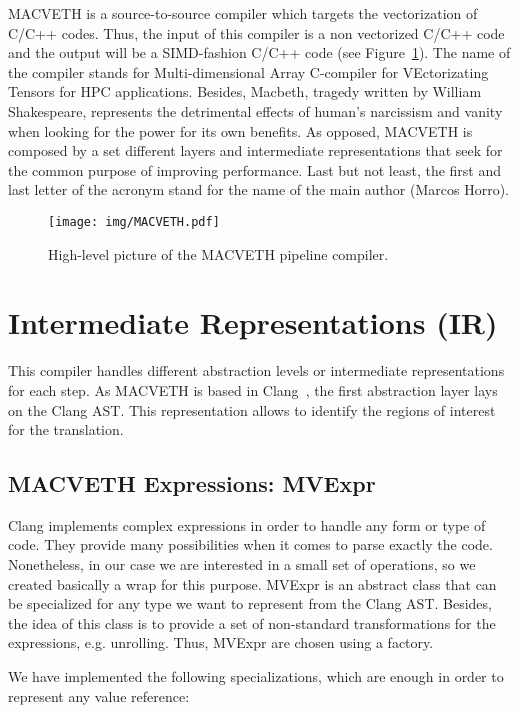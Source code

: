 \documentclass[a4paper,12pt]{memoir}
\begin{document}
MACVETH is a source-to-source compiler which targets the vectorization of C/C++
codes. Thus, the input of this compiler is a non vectorized C/C++ code and the
output will be a SIMD-fashion C/C++ code (see Figure~\ref{fig:MACVETHarch}).
The name of the compiler stands for Multi-dimensional Array C-compiler for
VEctorizating Tensors for HPC applications. Besides, Macbeth, tragedy
written by William Shakespeare, represents the detrimental effects of human's
narcissism and vanity when looking for the power for its own benefits. As
opposed, MACVETH is composed by a set different layers and intermediate
representations that seek for the common purpose of improving performance. Last
but not least, the first and last letter of the acronym stand for the name of
the main author (Marcos Horro).

\begin{figure}
	\centering
	\texttt{[image: img/MACVETH.pdf]}
	\caption{High-level picture of the MACVETH pipeline compiler.}
	\label{fig:MACVETHarch}
\end{figure}

\chapter{Intermediate Representations (IR)}



This compiler handles different abstraction levels or intermediate
representations for each step. As MACVETH is based in Clang~\cite{bib:clang},
the first abstraction layer lays on the Clang AST. This representation allows to
identify the regions of interest for the translation.

\section{MACVETH Expressions: MVExpr}
Clang implements complex expressions in order to handle any form or type of
code. They
provide many possibilities
when it comes to parse exactly the code. Nonetheless, in our case we are
interested in a small set of operations, so we created basically a wrap for this
purpose. MVExpr is an abstract class that can be specialized for any type we
want to represent from the Clang AST. Besides, the idea of this class is to
provide a set of non-standard transformations for the expressions, e.g.
unrolling. Thus, MVExpr are chosen using a factory.

We have implemented the following specializations, which are enough in order to
represent any value reference:
\end{document}
